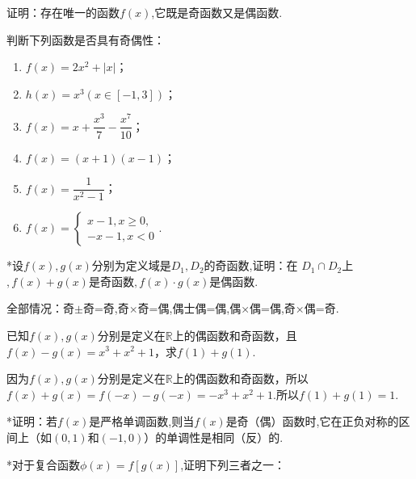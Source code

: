 \documentclass[lang=cn,newtx,10pt,scheme=chinese]{elegantbook}
\begin{document}
\begin{spacing}{1.8}
  \begin{exercise}
    证明：存在唯一的函数$f(x)$,它既是奇函数又是偶函数.
  \end{exercise}

  \begin{exercise}
    判断下列函数是否具有奇偶性：
  \end{exercise}

  \begin{enumerate}
    \item $f(x)=2x^2+|x|$；
    \item $h(x)=x^3(x\in[-1,3])$；
    \item $f(x)=x+\dfrac{x^3}7-\dfrac{x^7}{10}$；
    \item $f(x)=(x+1)(x-1)$；
    \item $f(x)=\dfrac{1}{x^{2}-1}$；
    \item $f(x)=\begin{cases}x-1, x\geqslant0,\\-x-1, x<0\end{cases}$.
  \end{enumerate}
\end{spacing}

\begin{exercise}
  *设$f(x),g(x)$分别为定义域是$D_1,D_2$的奇函数,证明：在 $D_1\cap D_2$上$,f(x)+g(x)$是奇函数$,f(x)\cdot g(x)$是偶函数.
\end{exercise}

\begin{remark}
  全部情况：奇$\pm$奇=奇,奇$\times$奇=偶,偶士偶=偶,偶×偶=偶,奇×偶=奇.
\end{remark}

\begin{exercise}
  已知$f(x),g(x)$分别是定义在$\mathbb{R}$上的偶函数和奇函数，且$f(x)-g(x)=x^3+x^2+1$，求$f(1)+g(1)$.
\end{exercise}

\begin{solution}
  因为$f(x),g(x)$分别是定义在$\mathbb{R}$上的偶函数和奇函数，所以$f(x)+g(x)=f(-x)-g(-x)=-x^3+x^2+1$.所以$f(1)+g(1)=1$.
\end{solution}

\begin{exercise}
  *证明：若$f(x)$是严格单调函数,则当$f(x)$是奇（偶）函数时,它在正负对称的区间上（如$(0,1)$和$(-1,0)$）的单调性是相同（反）的.
\end{exercise}

\begin{exercise}
  *对于复合函数$\phi(x)=f[g(x)]$,证明下列三者之一：
\end{exercise}
\end{document}
